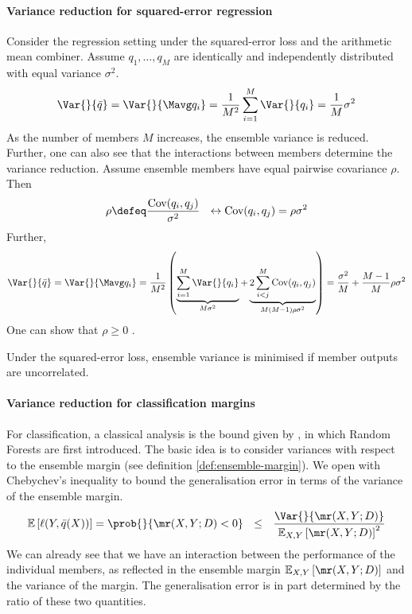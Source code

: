 \documentclass[
	twoside=false, %
]{kaobook}
\begin{document}
\paragraph{Variance reduction for squared-error regression} 
Consider the regression setting under the squared-error loss and the arithmetic mean combiner.
Assume $q_{1}, \dots, q_{M}$ are identically and independently distributed with equal variance $\sigma^2$.
$$
	\Var{}{\bar{q}} = \Var{}{\Mavg q_{i}} = \frac{1}{M^2} \sum_{i=1}^M \Var{}{q_{i}} = \frac{1}{M} \sigma^2
$$
As the number of members $M$ increases, the ensemble variance is reduced. Further, one can also see that the interactions between members determine the variance reduction. Assume ensemble members have equal pairwise covariance $\rho$. Then 
$$
\rho \defeq \frac{\text{Cov}(q_{i}, q_{j})}{\sigma^2} ~ ~ \leftrightarrow \text{Cov}(q_{i}, q_{j}) = \rho \sigma^2
$$
Further, 
$$
\Var{}{\bar{q}} = \Var{}{\Mavg q_{i}} = \frac{1}{M^2} \left( 
\underbrace{
\sum_{i=1}^M \Var{}{q_{i}}
}_{M\sigma^2}
+
\underbrace{
2 \sum_{i<j}^M \text{Cov}(q_{i}, q_{j})
}_{M(M-1)\rho \sigma^2}
\right)
= \frac{\sigma^2}{M} + \frac{M-1}{M} \rho \sigma^2
$$
One can show that $\rho \geq 0$ \cite{louppe_UnderstandingRandomForests_2015}. 
\begin{corollary}
  \label{cor:members-uncorrelated}
  Under the squared-error loss, ensemble variance is minimised if member outputs are uncorrelated.
\end{corollary}

\paragraph{Variance reduction for classification margins} For classification, a classical analysis is the bound given by \citeauthor{breiman_RandomForests_2001} \cite{breiman_RandomForests_2001}, in which Random Forests are first introduced. The basic idea is to consider variances with respect to the ensemble margin (see definition \ref{def:ensemble-margin}).
We open with Chebychev's inequality to bound the generalisation error in terms of the variance of the ensemble margin.
$$
\mathbb{E}\left[ \ell(Y, \bar{q}(X)) \right]  = \prob{}{\mr(X, Y; D) < 0 }  ~ ~ \leq ~ ~ \frac{\Var{}{\mr(X, Y; D)  }}{\mathbb{E}_{X,Y}\left[ \mr(X, Y; D)  \right]^2}
$$
We can already see that we have an interaction between the performance of the individual members, as reflected in the ensemble margin $\mathbb{E}_{X,Y}\left[ \mr(X, Y; D)  \right]$ and the variance of the margin.
The generalisation error is in part determined by the ratio of these two quantities.
\end{document}
